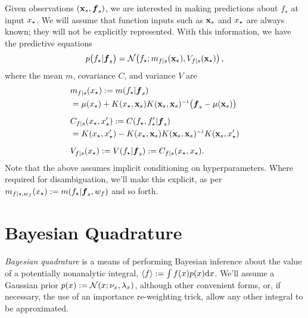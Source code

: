 \documentclass{article}
\renewcommand{\pskinny}[2]{p\big(#1|#2\big)}
\begin{document}
Given observations $(\vlfv_s,\vf_s)$, we are interested in making predictions about  $f_\star$ at input $\lfv_\star$. We will assume that function inputs such as $\vlfv_s$ and $\lfv_\star$ are always known; they will not be explicitly represented. With this information, we have the predictive equations
\begin{equation}
 \pskinny{f\st}{\vf_s} = 
\bN{f\st}
{\meancond{f}{\vlfv_\star}{s}}
{\covcond{f}{\vlfv_\star}{s}}\,,
\end{equation}
where the mean $m$, covariance $C$, and variance $V$ are
\begin{align} 
\textstyle
&\meancond{f}{\lfv_\star}{s}
\deq \mean{f_\star}{\vf_s}
\nonumber\\
&= \mu(\lfv_\star)+
K(\lfv_\star,\vlfv_s)
K(\vlfv_s,\vlfv_s)\inv
\bigl(\vf_s-{\mu}(\vlfv_s)\bigr)\label{eq:GPMean}
\\[0.2cm]
&C_{f|s}(\lfv_\star, \lfv'_\star)
\deq C(f_\star,f'_\star|\vf_s) 
\nonumber\\
&=K(\lfv_\star,\lfv'_\star) - 
K(\lfv_\star,\vlfv_s)
K(\vlfv_s,\vlfv_s)\inv
K(\vlfv_s,\lfv'_\star)%
\\[0.2cm]
&\covcond{f}{\lfv_\star}{s}
\deq {\cov{f_\star}{\vf_s}} 
\deq C_{f|s}(\lfv_\star, \lfv_\star).
\end{align} 
Note that the above assumes implicit conditioning on hyperparameters. Where required for disambiguation, we'll make this explicit, as per $m_{f|s,w_f}(x\st) \deq \mean{f\st}{\vf_s, w_f}$ and so forth.

\section{Bayesian Quadrature} \label{sec:bq}


\emph{Bayesian quadrature} \citep{BZHermiteQuadrature,BZMonteCarlo} is a means of performing Bayesian inference about the value of a potentially nonanalytic integral, $\inty{f} \deq \int f(x) p(x) \ud x$.
We'll assume a Gaussian prior
$\po{\lfv} \deq \N{\lfv}{\nu_{\lfv}}{\lambda_{\lfv}}$,
although other convenient forms, or, if necessary, the use of an importance re-weighting trick, allow any other integral to be approximated. 
\end{document}
